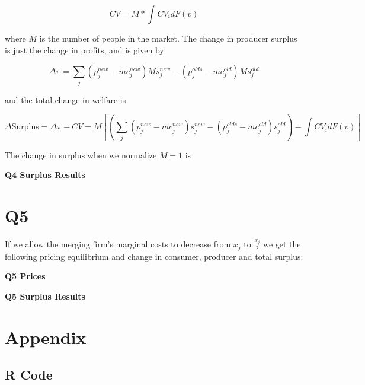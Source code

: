 \documentclass{article}
\newcommand{\1}{\mathbbm{1}}
\begin{document}
$$CV = M*\int CV_i dF(v)$$

where $M$ is the number of people in the market. The change in producer surplus is just the change in profits, and is given by 

$$\Delta \pi = \sum_j (p_j^{new} - mc_j^{new})Ms_j^{new} - (p_j^{olds} - mc_j^{old})Ms_j^{old}$$

and the total change in welfare is 

$$\Delta \text{Surplus} = \Delta \pi - CV = M[(\sum_j (p_j^{new} - mc_j^{new})s_j^{new} - (p_j^{olds} - mc_j^{old})s_j^{old}) - \int CV_i dF(v)] $$

The change in surplus when we normalize $M = 1$ is 


\begin{center}
	\centering
	\textbf{Q4 Surplus Results}\par\medskip
	\scalebox{1}{
		
	}
\end{center}

\section{Q5}
If we allow the merging firm's marginal costs to decrease from $x_j$ to $\frac{x_j}{2}$ we get the following pricing equilibrium and change in consumer, producer and total surplus:


\begin{center}
	\centering
	\textbf{Q5 Prices}\par\medskip
	\scalebox{1}{
		
	}
\end{center}

\begin{center}
	\centering
	\textbf{Q5 Surplus Results}\par\medskip
	\scalebox{1}{
		
	}
\end{center}






\section{Appendix}
\subsection{R Code}


\end{document}
